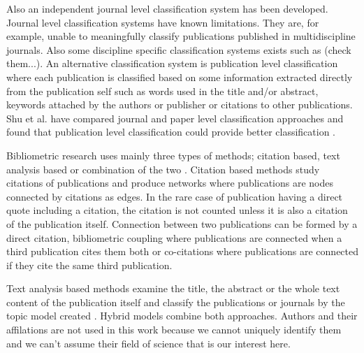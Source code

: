 Also an independent journal level classification system has been 
developed. \cite{archambault_towards_2011}
Journal level classification systems have known limitations.
They are, for example, unable to meaningfully classify
publications published in multidiscipline journals.
Also some discipline specific classification systems exists such 
as (check them...).
An alternative classification system is publication level 
classification where each publication is classified based on some 
information extracted directly from the publication self such as
words used in the title and/or abstract, keywords attached by the
authors or publisher or citations to other publications.
Shu et al. have compared journal and paper level classification
approaches and found that publication level classification could
provide better classification \cite{shu_comparing_2019}.

Bibliometric research 
uses mainly three types of methods; citation based, text analysis 
based or combination of the two \cite{janssens_hybrid_2009}.
Citation based methods study citations of publications and produce
networks where publications are nodes connected by citations as 
edges. In
 the rare case of publication having a direct quote including a
 citation, the citation is not counted unless it is also a
 citation of the publication itself.
Connection between two publications can be 
formed by a direct citation, bibliometric coupling where 
publications are connected when a third publication cites them 
both or co-citations where publications are connected if they 
cite the same third publication.

Text analysis based methods examine the title, the abstract or 
the whole text content of the publication itself and classify 
the publications or journals by the topic model created 
\cite{blei_latent_2003}.
Hybrid models combine both approaches. Authors and their
affilations are not used in this work because we cannot uniquely
identify them and we can't assume their field of science that is
our interest here.




